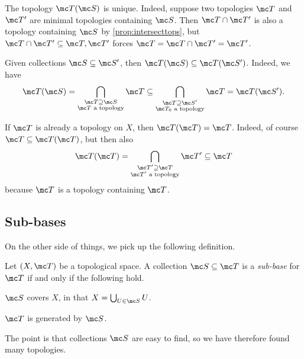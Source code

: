 \documentclass[../notes.tex]{subfiles}
\begin{document}
\begin{remark}[Nir]
	The topology $\mc T(\mc S)$ is unique. Indeed, suppose two topologies $\mc T$ and $\mc T'$ are minimal topologies containing $\mc S$. Then $\mc T\cap\mc T'$ is also a topology containing $\mc S$ by \autoref{prop:intersecttops}, but $\mc T\cap\mc T'\subseteq\mc T,\mc T'$ forces $\mc T=\mc T\cap\mc T'=\mc T'$.
\end{remark}
\begin{remark}[Nir] \label{rem:largersubbase}
	Given collections $\mc S\subseteq\mc S'$, then $\mc T(\mc S)\subseteq\mc T(\mc S')$. Indeed, we have
	\[\mc T(\mc S)=\bigcap_{\substack{\mc T\supseteq\mc S\\\mc T\text{ a topology}}}\mc T\subseteq\bigcap_{\substack{\mc T\supseteq\mc S'\\\mc T_0\text{ a topology}}}\mc T=\mc T(\mc S').\]
\end{remark}
\begin{remark}[Nir] \label{rem:topgenitself}
	If $\mc T$ is already a topology on $X$, then $\mc T(\mc T)=\mc T$. Indeed, of course $\mc T\subseteq\mc T(\mc T)$, but then also
	\[\mc T(\mc T)=\bigcap_{\substack{\mc T'\supseteq\mc T\\\mc T'\text{ a topology}}}\mc T'\subseteq\mc T\]
	because $\mc T$ is a topology containing $\mc T$.
\end{remark}

\subsection{Sub-bases}
On the other side of things, we pick up the following definition.
\begin{definition}
	Let $(X,\mc T)$ be a topological space. A collection $\mc S\subseteq\mc T$ is a \textit{sub-base} for $\mc T$ if and only if the following hold.
	\begin{listalph}
		\item $\mc S$ covers $X$, in that $X=\bigcup_{U\in\mc S}U$.
		\item $\mc T$ is generated by $\mc S$.
	\end{listalph}
\end{definition}
The point is that collections $\mc S$ are easy to find, so we have therefore found many topologies.
\end{document}
